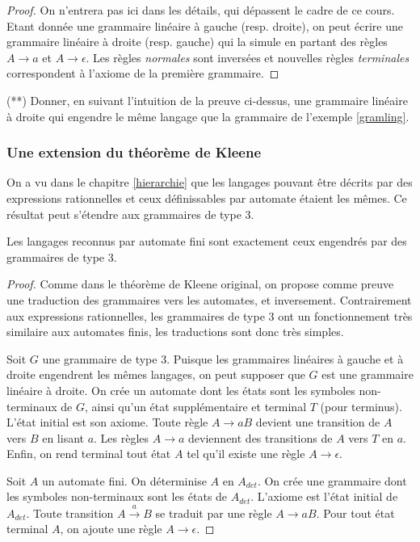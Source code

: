 \begin{proof}
On n'entrera pas ici dans les détails, qui dépassent le cadre de ce cours. Etant donnée une grammaire linéaire à gauche (resp. droite), on peut écrire une grammaire linéaire à droite (resp. gauche) qui la simule en partant des règles $A \rightarrow a$ et $A \rightarrow \epsilon$. Les règles \textit{normales} sont inversées et nouvelles règles \textit{terminales} correspondent à l'axiome de la première grammaire. 
\end{proof}

\begin{exercice}(**) Donner, en suivant l'intuition de la preuve ci-dessus, une grammaire linéaire à droite qui engendre le même langage que la grammaire de l'exemple \ref{gramling}.
\end{exercice}

\subsubsection{Une extension du théorème de Kleene}
On a vu dans le chapitre \ref{hierarchie} que les langages pouvant être décrits par des expressions rationnelles et ceux définissables par automate étaient les mêmes. Ce résultat peut s'étendre aux grammaires de type 3.

\begin{theorem}
\label{kleeneplusplus}
Les langages reconnus par automate fini sont exactement ceux engendrés par des grammaires de type 3.
\end{theorem}

\begin{proof}
Comme dans le théorème de Kleene original, on propose comme preuve une traduction des grammaires vers les automates, et inversement. Contrairement aux expressions rationnelles, les grammaires de type 3 ont un fonctionnement très similaire aux automates finis, les traductions sont donc très simples.

Soit $G$ une grammaire de type 3. Puisque les grammaires linéaires à gauche et à droite engendrent les mêmes langages, on peut supposer que $G$ est une grammaire linéaire à droite. On crée un automate dont les états sont les symboles non-terminaux de $G$, ainsi qu'un état supplémentaire et terminal $T$ (pour terminus). L'état initial est son axiome. Toute règle $A \rightarrow aB$ devient une transition de $A$ vers $B$ en lisant $a$. Les règles $A \rightarrow a$ deviennent des transitions de $A$ vers $T$ en $a$. Enfin, on rend terminal tout état $A$ tel qu'il existe une règle $A \rightarrow \epsilon$.

Soit $A$ un automate fini. On déterminise $A$ en $A_{det}$. On crée une grammaire dont les symboles non-terminaux sont les états de $A_{det}$. L'axiome est l'état initial de $A_{det}$. Toute transition $A \xrightarrow{a} B$ se traduit par une règle $A \rightarrow aB $. Pour tout état terminal $A$, on ajoute une règle $A \rightarrow \epsilon$.
\end{proof}

